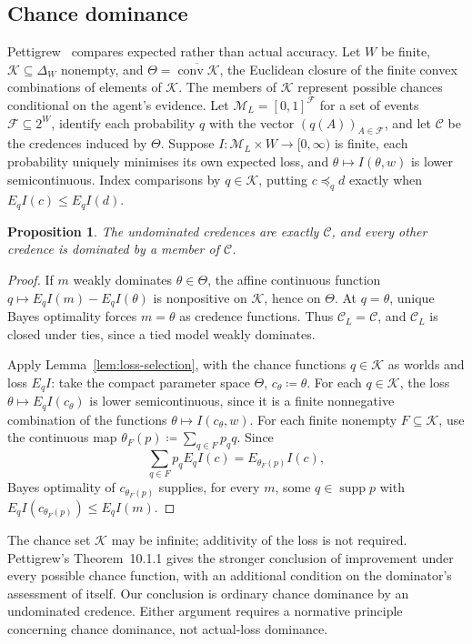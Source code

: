 \documentclass[11pt]{article}
\newtheorem{proposition}[theorem]{Proposition}
\theoremstyle{definition}
\theoremstyle{remark}
\newcommand{\M}{\mathcal M}
\newcommand{\C}{\mathcal C}
\newcommand{\supp}{\operatorname{supp}}
\begin{document}
\subsection{Chance dominance}\label{sec:chance}
Pettigrew~\cite[Chapter~10]{Pettigrew2016} compares expected rather than actual accuracy. Let $W$ be finite, $\mathcal K\subseteq\Delta_W$ nonempty, and $\Theta=\overline{\operatorname{conv}\mathcal K}$, the Euclidean closure of the finite convex combinations of elements of $\mathcal K$. The members of $\mathcal K$ represent possible chances conditional on the agent's evidence. Let $\M_L=[0,1]^{\mathcal F}$ for a set of events $\mathcal F\subseteq2^W$, identify each probability $q$ with the vector $(q(A))_{A\in\mathcal F}$, and let $\C$ be the credences induced by $\Theta$. Suppose $I:\M_L\times W\to[0,\infty)$ is finite, each probability uniquely minimises its own expected loss, and $\theta\mapsto I(\theta,w)$ is lower semicontinuous. Index comparisons by $q\in\mathcal K$, putting $c\preceq_q d$ exactly when $E_qI(c)\le E_qI(d)$.
\begin{proposition}\label{prop:short-chance}
The undominated credences are exactly $\C$, and every other credence is dominated by a member of $\C$.
\end{proposition}
\begin{proof}
If $m$ weakly dominates $\theta\in\Theta$, the affine continuous function $q\mapsto E_qI(m)-E_qI(\theta)$ is nonpositive on $\mathcal K$, hence on $\Theta$. At $q=\theta$, unique Bayes optimality forces $m=\theta$ as credence functions. Thus $\C_L=\C$, and $\C_L$ is closed under ties, since a tied model weakly dominates.

Apply Lemma~\ref{lem:loss-selection}, with the chance functions $q\in\mathcal K$ as worlds and loss $E_qI$: take the compact parameter space $\Theta$, $c_\theta\coloneqq\theta$. For each $q\in\mathcal K$, the loss $\theta\mapsto E_qI(c_\theta)$ is lower semicontinuous, since it is a finite nonnegative combination of the functions $\theta\mapsto I(c_\theta,w)$. For each finite nonempty $F\subseteq\mathcal K$, use the continuous map $\theta_F(p)\coloneqq\sum_{q\in F}p_qq$. Since
\[
\sum_{q\in F}p_qE_qI(c)=E_{\theta_F(p)}I(c),
\]
Bayes optimality of $c_{\theta_F(p)}$ supplies, for every $m$, some $q\in\supp p$ with $E_qI(c_{\theta_F(p)})\le E_qI(m)$.
\end{proof}
The chance set $\mathcal K$ may be infinite; additivity of the loss is not required. Pettigrew's Theorem~10.1.1 gives the stronger conclusion of improvement under every possible chance function, with an additional condition on the dominator's assessment of itself. Our conclusion is ordinary chance dominance by an undominated credence. Either argument requires a normative principle concerning chance dominance, not actual-loss dominance.




\end{document}
